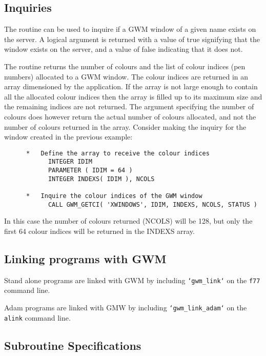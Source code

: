 \subsection{Inquiries}
The routine 
can be used to inquire if a GWM window of
a given name exists on the server. A logical argument is returned with
a value of true signifying that the window exists on the server, and
a value of false indicating that it does not.

The routine 
returns the number of colours and the list
of colour indices (pen numbers) allocated to a GWM window. The colour
indices are returned in an array dimensioned by the application. If the
array is not large enough to contain all the allocated colour indices
then the array is filled up to its maximum size and the remaining indices
are not returned. The argument specifying the number of colours does
however return the actual number of colours allocated, and not the number
of colours returned in the array. Consider making the inquiry for
the window created in the previous example:

\begin{small}
\begin{verbatim}
      *   Define the array to receive the colour indices
            INTEGER IDIM
            PARAMETER ( IDIM = 64 )
            INTEGER INDEXS( IDIM ), NCOLS

      *   Inquire the colour indices of the GWM window
            CALL GWM_GETCI( 'XWINDOWS', IDIM, INDEXS, NCOLS, STATUS )
\end{verbatim}
\end{small}

In this case the number of colours returned (NCOLS) will be 128, but
only the first 64 colour indices will be returned in the INDEXS array.

\subsection{Linking programs with GWM}
Stand alone programs are linked with GWM by including
{\tt `gwm\_link`} on the {\tt f77} command line.

Adam programs are linked with GMW by including {\tt `gwm\_link\_adam`} on the
{\tt alink} command line.

\newpage
\subsection{Subroutine Specifications}


